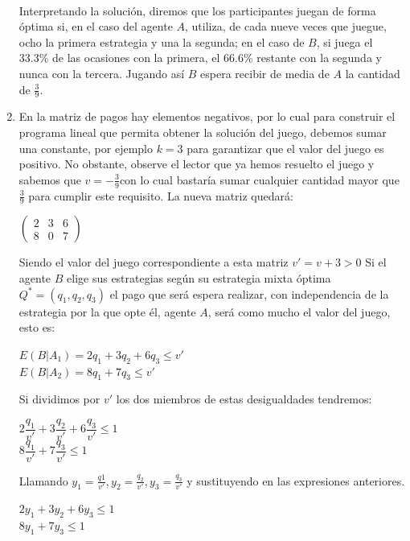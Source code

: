 \begin{enumerate}
\\
Interpretando la solución, diremos que los participantes juegan de forma óptima si, en el caso del agente $A$, utiliza, de cada nueve veces que juegue, ocho la primera estrategia y una la segunda; en el caso de $B$, si juega el 33.3\% de las ocasiones con la primera, el 66.6\% restante con la segunda y nunca con la tercera. Jugando así $B$ espera recibir de media de $A$ la cantidad de $\frac{3}{9}$.
\item En la matriz de pagos hay elementos negativos, por lo cual para construir el programa lineal que permita obtener la solución del juego, debemos sumar una constante, por ejemplo $k=3$ para garantizar que el valor del juego es positivo. No obstante, observe el lector que ya hemos resuelto el juego y sabemos que $v=-\frac{3}{9}$con lo cual bastaría sumar cualquier cantidad mayor que $\frac{3}{9}$ para cumplir este requisito.
La nueva matriz quedará:\\
\begin{center}
  $  \begin{pmatrix}
    2 & 3 & 6\\
    8 & 0 & 7
    \end{pmatrix}$\\
\end{center}
Siendo el valor del juego correspondiente a esta matriz $v'=v+3>0$
Si el agente $B$ elige sus estrategias según su estrategia mixta óptima $Q^*=(q_1,q_2,q_3)$  el pago que será espera realizar, con independencia de la estrategia por la que opte él, agente $A$, será como mucho el valor del juego, esto es:
\begin{center}
    $E(B|A_1)=2q_1+3q_2+6q_3\leq v'$\\
    $E(B|A_2)=8q_1+7q_3\leq v'$ \\
\end{center}
Si dividimos por $v'$ los dos miembros de estas desigualdades tendremos:
\\
\begin{center}
    $2\dfrac{q_1}{v'}+3\dfrac{q_2}{v'}+6\dfrac{q_3}{v'}\leq 1 $\\
    $8\dfrac{q_1}{v'}+7\dfrac{q_3}{v'}\leq 1$
\end{center}
Llamando $y_1=\frac{q1}{v'},y_2=\frac{q_2}{v'},y_3=\frac{q_3}{v'}$ y sustituyendo en las expresiones anteriores.
\begin{center}
    $2y_1+3y_2+6y_3\leq 1$\\
    $8y_1+7y_3\leq 1$\\
\end{center}


\end{enumerate}
